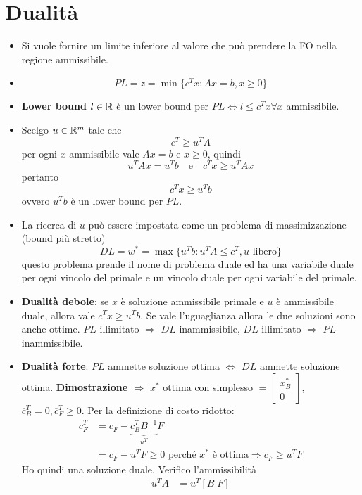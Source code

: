 \section{Dualità}

\begin{itemize}
	\item Si vuole fornire un limite inferiore al valore che può prendere la FO nella regione ammissibile.
	\item $$
	PL = z = \min\{  c^Tx : Ax = b, x\geq 0 \}
	$$
	\item \textbf{Lower bound} $l \in \mathbb{R}$ è un lower bound per $PL \Leftrightarrow l \leq c^Tx \forall x$ ammissibile.
	\item Scelgo $u \in \mathbb{R}^m$ tale che
	$$
	c^T \geq u^T A
	$$
	per ogni $x$ ammissibile vale $Ax=b$ e $x \geq 0$, quindi
	$$
	u^TA x = u^Tb \quad\text{e}\quad c^Tx \geq u^TAx
	$$
	pertanto
	$$
	c^Tx \geq u^Tb
	$$
	ovvero $u^Tb$ è un lower bound per $PL$.
	\item La ricerca di $u$ può essere impostata come un problema di massimizzazione (bound più stretto)
	$$
	DL = w^* = \max \{ u^Tb : u^TA \leq c^T, u \text{ libero} \}
	$$
	questo problema prende il nome di problema duale ed ha una variabile duale per ogni vincolo del primale e un vincolo duale per ogni variabile del primale.
	\item \textbf{Dualità debole}: se $x$ è soluzione ammissibile primale e $u$ è ammissibile duale, allora vale $c^Tx \geq u^{T}b$. Se vale l'uguaglianza allora le due soluzioni sono anche ottime. $PL$ illimitato $\Rightarrow$ $DL$ inammissibile, $DL$ illimitato $\Rightarrow$ $PL$ inammissibile.
	\item \textbf{Dualità forte}: $PL$ ammette soluzione ottima $\Leftrightarrow$ $DL$ ammette soluzione ottima. \textbf{Dimostrazione $\Rightarrow$} $x^*$ ottima con simplesso $= \begin{bmatrix}
	x^*_B \\
	0
	\end{bmatrix}$, $\overline{c}_{B}^T = 0,\overline{c}_{F}^T \geq 0$. Per la definizione di costo ridotto:
	\begin{align*}
	\overline{c}_{F}^T &= c_F - \underbrace{c_{B}^TB^{-1}}_{u^T}F \\
					   &= c_F - u^T F \geq 0 \text{ perché $x^*$ è ottima} \Rightarrow c_F \geq u^TF
	\end{align*}
	Ho quindi una soluzione duale. Verifico l'ammissibilità
	\begin{align*}
		u^T A &= u^T[B|F] \\

\end{align*}
\end{itemize}

